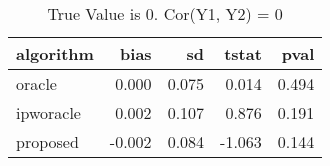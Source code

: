\begin{table}[h!]

\caption{True Value is 0. Cor(Y1, Y2) = 0}
\centering
\begin{tabular}[t]{lrrrr}
\toprule
algorithm & bias & sd & tstat & pval\\
\midrule
oracle & 0.000 & 0.075 & 0.014 & 0.494\\
ipworacle & 0.002 & 0.107 & 0.876 & 0.191\\
proposed & -0.002 & 0.084 & -1.063 & 0.144\\
\bottomrule
\end{tabular}
\end{table}
